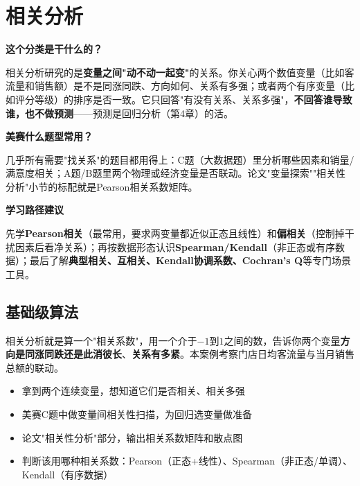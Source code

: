 \chapter{相关分析}

\begin{chapteroverview}
\textbf{这个分类是干什么的？}

相关分析研究的是\textbf{变量之间"动不动一起变"}的关系。你关心两个数值变量（比如客流量和销售额）是不是同涨同跌、方向如何、关系有多强；或者两个有序变量（比如评分等级）的排序是否一致。它只回答"有没有关系、关系多强"，\textbf{不回答谁导致谁，也不做预测}——预测是回归分析（第4章）的活。

\textbf{美赛什么题型常用？}

几乎所有需要"找关系"的题目都用得上：C题（大数据题）里分析哪些因素和销量/满意度相关；A题/B题里两个物理或经济变量是否联动。论文"变量探索""相关性分析"小节的标配就是Pearson相关系数矩阵。

\textbf{学习路径建议}

先学\textbf{Pearson相关}（最常用，要求两变量都近似正态且线性）和\textbf{偏相关}（控制掉干扰因素后看净关系）；再按数据形态认识\textbf{Spearman/Kendall}（非正态或有序数据）；最后了解\textbf{典型相关、互相关、Kendall协调系数、Cochran's Q}等专门场景工具。
\end{chapteroverview}

\section{基础级算法}


\begin{algointro}
相关分析就是算一个"相关系数"，用一个介于$-1$到$1$之间的数，告诉你两个变量\textbf{方向是同涨同跌还是此消彼长}、\textbf{关系有多紧}。本案例考察门店日均客流量与当月销售总额的联动。
\end{algointro}

\begin{algoscene}
\begin{itemize}
    \item 拿到两个连续变量，想知道它们是否相关、相关多强
    \item 美赛C题中做变量间相关性扫描，为回归选变量做准备
    \item 论文"相关性分析"部分，输出相关系数矩阵和散点图
    \item 判断该用哪种相关系数：Pearson（正态+线性）、Spearman（非正态/单调）、Kendall（有序数据）
\end{itemize}
\end{algoscene}


